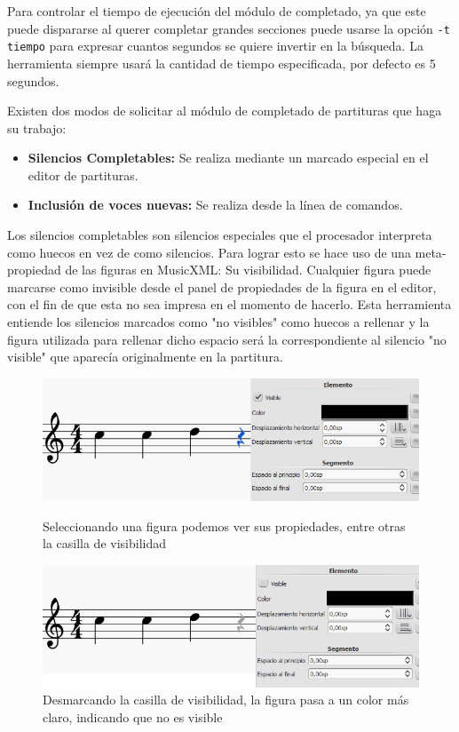 Para controlar el tiempo de ejecución del módulo de completado, ya que este puede dispararse al querer completar grandes secciones puede usarse la opción \texttt{-t tiempo} para expresar cuantos segundos se quiere invertir en la búsqueda. La herramienta siempre usará la cantidad de tiempo especificada, por defecto es 5 segundos.

Existen dos modos de solicitar al módulo de completado de partituras que haga su trabajo:
\begin{itemize}
	\item \textbf{Silencios Completables:} Se realiza mediante un marcado especial en el editor de partituras.
	\item \textbf{Inclusión de voces nuevas:} Se realiza desde la línea de comandos.
\end{itemize}

Los silencios completables son silencios especiales que el procesador interpreta como huecos en vez de como silencios. Para lograr esto se hace uso de una meta-propiedad de las figuras en MusicXML: Su visibilidad. Cualquier figura puede marcarse como invisible desde el panel de propiedades de la figura en el editor, con el fin de que esta no sea impresa en el momento de hacerlo. Esta herramienta entiende los silencios marcados como "no visibles" como huecos a rellenar y la figura utilizada para rellenar dicho espacio será la correspondiente al silencio "no visible" que aparecía originalmente en la partitura.

\begin{figure}[h]
	\centering
	\includegraphics[width=0.8\linewidth]{imagenes/usage/select_silence.jpg}
	\caption{Seleccionando una figura podemos ver sus propiedades, entre otras la casilla de visibilidad}
	\includegraphics[width=0.8\linewidth]{imagenes/usage/invisible_silence.jpg}
	\caption{Desmarcando la casilla de visibilidad, la figura pasa a un color más claro, indicando que no es visible}
	\label{fig:invisible_silence}
\end{figure}

